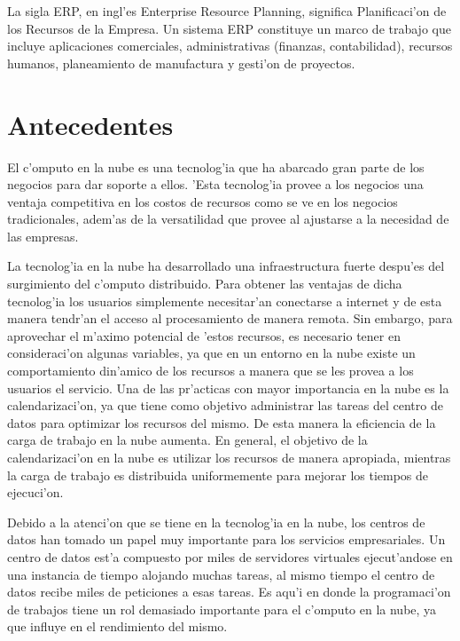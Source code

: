 La sigla ERP, en ingl'es Enterprise Resource Planning, significa Planificaci'on de los Recursos de la Empresa. Un sistema ERP constituye un marco de trabajo que incluye aplicaciones comerciales, administrativas (finanzas, contabilidad), recursos humanos, planeamiento de manufactura y gesti'on de proyectos. \cite{saroka2002sistemas}


\section*{Antecedentes}

El c'omputo en la nube es una tecnolog'ia que ha abarcado gran parte de los negocios  para dar soporte a ellos. 'Esta tecnolog'ia provee a los negocios una ventaja competitiva en los costos de recursos como se ve en los negocios tradicionales, adem'as de la versatilidad que provee al ajustarse a la necesidad de las empresas. \cite{srinivasan2014cloud}

La tecnolog'ia en la nube ha desarrollado una infraestructura fuerte despu'es del surgimiento del c'omputo distribuido.\cite{chen2009cloud} Para obtener las ventajas de dicha tecnolog'ia los usuarios simplemente necesitar'an conectarse a internet y de esta manera tendr'an el acceso al procesamiento de manera remota.\cite{aranganathan2011aco} Sin embargo, para aprovechar el m'aximo potencial de 'estos recursos, es necesario tener en consideraci'on algunas variables, ya que en un entorno en la nube existe un comportamiento din'amico de los recursos a manera que se les provea a los usuarios el servicio.\cite{shimpy2014different}
Una de las pr'acticas con mayor importancia en la nube es la calendarizaci'on, ya que tiene como objetivo administrar las tareas del centro de datos para optimizar los recursos del mismo. De esta manera la eficiencia de la carga de trabajo en la nube aumenta.\cite{shimpy2014different}
En general, el objetivo de la calendarizaci'on en la nube es utilizar los recursos de manera apropiada, mientras la carga de trabajo es distribuida uniformemente para mejorar los tiempos de ejecuci'on.\cite{shimpy2014different}

Debido a la atenci'on que se tiene en la tecnolog'ia en la nube, los centros de datos han tomado un papel muy importante para los servicios empresariales.\cite{shimpy2014different} Un centro de datos est'a compuesto por miles de servidores virtuales ejecut'andose en una instancia de tiempo alojando muchas tareas, al mismo tiempo el centro de datos recibe miles de peticiones a esas tareas. Es aqu'i en donde la programaci'on de trabajos tiene un rol demasiado importante para el c'omputo en la nube, ya que influye en el rendimiento del mismo.\cite{srinivasan2014cloud} 

